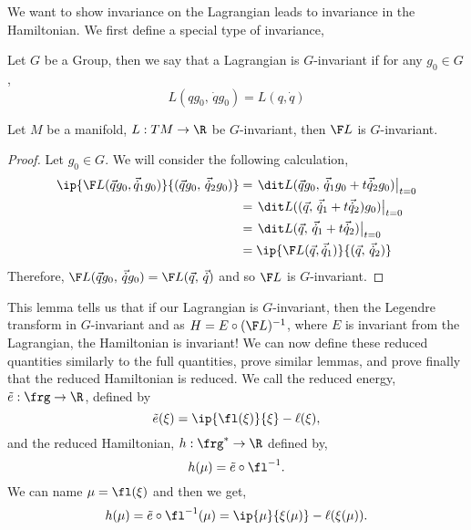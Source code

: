 \noindent
We want to show invariance on the Lagrangian leads to invariance in the Hamiltonian. We first define a special type of invariance,
\begin{ndefi}[G-invariance]
  Let $G$ be a Group, then we say that a Lagrangian is $G$-invariant if for any $g_0 \in G$,
  $$ L(qg_0,\, \dot qg_0) = L(q, \dot q)$$
\end{ndefi}

\begin{nlemma}
  Let $M$ be a manifold, $L :TM \to \R$ be $G$-invariant, then $\F L$ is $G$-invariant.
\end{nlemma}
\begin{proof}
  Let $g_0 \in G$. We will consider the following calculation,
  \begin{align*}
    \ip{\F L(\vec qg_0, \vec{\dot q}_1g_0)}{(\vec qg_0,\, \vec{\dot q}_2g_0)} &= \left.\dit L(\vec qg_0,\, \vec {\dot q}_1g_0 + t\vec {\dot q}_2g_0 )\right|_{t = 0} \\
    &= \left.\dit L((\vec q,\, \vec {\dot q}_1  + t\vec {\dot q}_2 )g_0)\right|_{t=0} \\
    &= \left.\dit L(\vec q,\, \vec {\dot q}_1  + t\vec {\dot q}_2 )\right|_{t=0} \\
    &= \ip{\F L(\vec q, \vec {\dot q}_1)}{(\vec q,\, \vec {\dot q}_2)}
  \end{align*}
  Therefore, $\F L(\vec qg_0,\, \vec{\dot q}g_0) = \F L(\vec q,\, \vec{\dot q})$ and so $\F L$ is $G$-invariant.
\end{proof}

\noindent
This lemma tells us that if our Lagrangian is $G$-invariant, then the Legendre transform in $G$-invariant and as $H = E \circ (\F L)^{-1}$, where $E$ is invariant from the Lagrangian, the Hamiltonian is invariant! We can now define these reduced quantities similarly to the full quantities, prove similar lemmas, and prove finally that the reduced Hamiltonian is reduced. We call the reduced energy, $\tilde e : \frg \to \R$, defined by
$$ \tilde e(\xi) = \ip{\fl(\xi)}{\xi} - \ell(\xi), $$
and the reduced Hamiltonian, $h : \frg^* \to \R$ defined by,
$$ h(\mu) = \tilde e \circ \fl^{-1}. $$
We can name $\mu = \fl(\xi)$ and then we get,
$$ h(\mu) = \tilde e \circ \fl^{-1}(\mu) = \ip{\mu}{\xi(\mu)} - \ell(\xi(\mu)). $$

